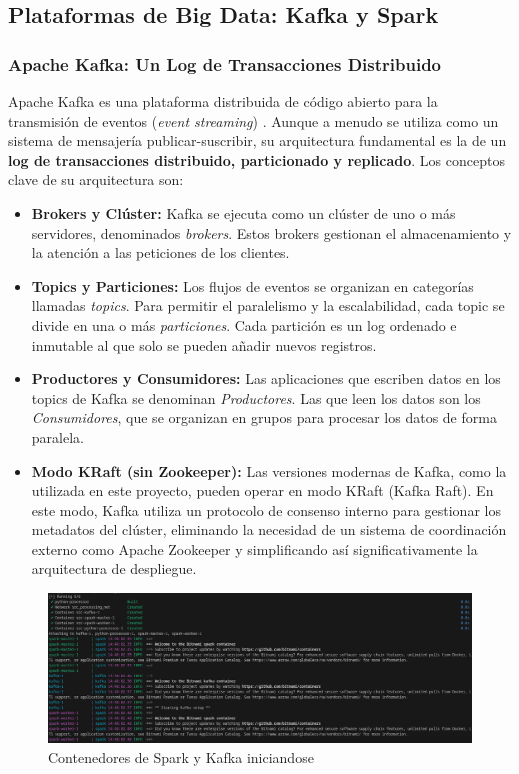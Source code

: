 \subsection{Plataformas de Big Data: Kafka y Spark}
\subsubsection{Apache Kafka: Un Log de Transacciones Distribuido}
Apache Kafka es una plataforma distribuida de código abierto para la transmisión de eventos (\textit{event streaming}) \cite{KafkaWebDoc}. Aunque a menudo se utiliza como un sistema de mensajería publicar-suscribir, su arquitectura fundamental es la de un \textbf{log de transacciones distribuido, particionado y replicado}. Los conceptos clave de su arquitectura son:
\begin{itemize}
    \item \textbf{Brokers y Clúster:} Kafka se ejecuta como un clúster de uno o más servidores, denominados \textit{brokers}. Estos brokers gestionan el almacenamiento y la atención a las peticiones de los clientes.
    \item \textbf{Topics y Particiones:} Los flujos de eventos se organizan en categorías llamadas \textit{topics}. Para permitir el paralelismo y la escalabilidad, cada topic se divide en una o más \textit{particiones}. Cada partición es un log ordenado e inmutable al que solo se pueden añadir nuevos registros.
    \item \textbf{Productores y Consumidores:} Las aplicaciones que escriben datos en los topics de Kafka se denominan \textit{Productores}. Las que leen los datos son los \textit{Consumidores}, que se organizan en grupos para procesar los datos de forma paralela.
    \item \textbf{Modo KRaft (sin Zookeeper):} Las versiones modernas de Kafka, como la utilizada en este proyecto, pueden operar en modo KRaft (Kafka Raft). En este modo, Kafka utiliza un protocolo de consenso interno para gestionar los metadatos del clúster, eliminando la necesidad de un sistema de coordinación externo como Apache Zookeeper y simplificando así significativamente la arquitectura de despliegue.
\end{itemize}

\begin{figure}[H]
    \centering
    \includegraphics[width=\textwidth]{img/montarsparkkafka.png}
    \caption{Contenedores de Spark y Kafka iniciandose}
    \label{fig:MontajeSparkKafka}
\end{figure}

